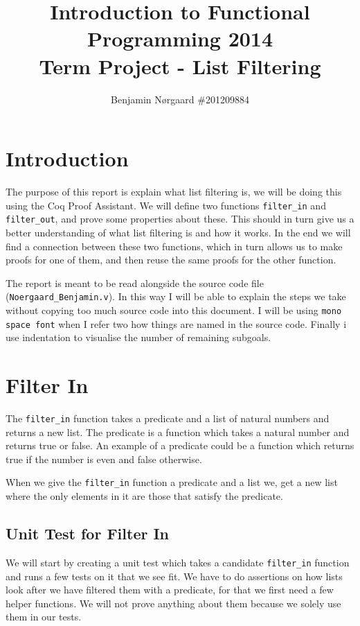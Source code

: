 \documentclass{article}
\title{
Introduction to Functional Programming 2014\\
Term Project - List Filtering
}
\author{
  Benjamin Nørgaard \#201209884\\
}
\begin{document}
\maketitle
\clearpage
\tableofcontents
\clearpage
\section{Introduction}
The purpose of this report is explain what list filtering is, we will be doing this using the Coq Proof Assistant. We will define two functions \texttt{filter\_in} and \texttt{filter\_out}, and prove some properties about these. This should in turn give us a better understanding of what list filtering is and how it works. In the end we will find a connection between these two functions, which in turn allows us to make proofs for one of them, and then reuse the same proofs for the other function.

The report is meant to be read alongside the source code file (\texttt{Noergaard\_Benjamin.v}). In this way I will be able to explain the steps we take without copying too much source code into this document. I will be using \texttt{mono space font} when I refer two how things are named in the source code. Finally i use indentation to visualise the number of remaining subgoals.

\section{Filter In}
The \texttt{filter\_in} function takes a predicate and a list of natural numbers and returns a new list. The predicate is a function which takes a natural number and returns true or false. An example of a predicate could be a function which returns true if the number is even and false otherwise.

When we give the \texttt{filter\_in} function a predicate and a list we, get a new list where the only elements in it are those that satisfy the predicate.

\subsection{Unit Test for Filter In}
We will start by creating a unit test which takes a candidate \texttt{filter\_in} function and runs a few tests on it that we see fit. We have to do assertions on how lists look after we have filtered them with a predicate, for that we first need a few helper functions. We will not prove anything about them because we solely use them in our tests.
\end{document}
